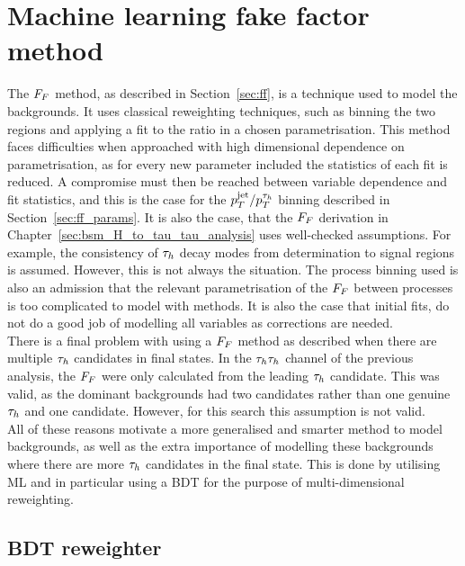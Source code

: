 \section{Machine learning fake factor method}
\label{sec:ml_ff}

The $F_{F}$ method, as described in Section~\ref{sec:ff}, is a technique used to model the \jtth backgrounds.
It uses classical reweighting techniques, such as binning the two regions and applying a fit to the ratio in a chosen parametrisation.
This method faces difficulties when approached with high dimensional dependence on parametrisation, as for every new parameter included the statistics of each fit is reduced.
A compromise must then be reached between variable dependence and fit statistics, and this is the case for the $p_{T}^{\text{jet}}/p_{T}^{\tau_{h}}$ binning described in Section~\ref{sec:ff_params}.
It is also the case, that the $F_{F}$ derivation in Chapter~\ref{sec:bsm_H_to_tau_tau_analysis} uses well-checked assumptions. 
For example, the consistency of $\tau_{h}$ decay modes from determination to signal regions is assumed. 
However, this is not always the situation.
The process binning used is also an admission that the relevant parametrisation of the $F_{F}$ between processes is too complicated to model with  methods.
It is also the case that initial fits, do not do a good job of modelling all variables as corrections are needed. \\

There is a final problem with using a $F_{F}$ method as described when there are multiple $\tau_{h}$ candidates in final states. 
In the $\tau_{h}\tau_{h}$ channel of the previous analysis, the $F_{F}$ were only calculated from the leading $\tau_{h}$ candidate.
This was valid, as the dominant backgrounds had two \jtth candidates rather than one genuine $\tau_{h}$ and one \jtth candidate.
However, for this search this assumption is not valid. \\

All of these reasons motivate a more generalised and smarter method to model \jtth backgrounds, as well as the extra importance of modelling these backgrounds where there are more $\tau_{h}$ candidates in the final state.
This is done by utilising \ac{ML} and in particular using a \ac{BDT} for the purpose of multi-dimensional reweighting. \\ 

\subsection{BDT reweighter}

